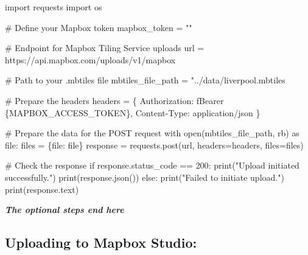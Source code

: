 \documentclass[
  letterpaper,
  DIV=11,
  numbers=noendperiod]{scrreprt}
\newenvironment{Shaded}{\begin{snugshade}}{\end{snugshade}}
\newcommand{\BuiltInTok}[1]{\textcolor[rgb]{0.00,0.23,0.31}{#1}}
\newcommand{\CommentTok}[1]{\textcolor[rgb]{0.37,0.37,0.37}{#1}}
\newcommand{\ControlFlowTok}[1]{\textcolor[rgb]{0.00,0.23,0.31}{#1}}
\newcommand{\DecValTok}[1]{\textcolor[rgb]{0.68,0.00,0.00}{#1}}
\newcommand{\ErrorTok}[1]{\textcolor[rgb]{0.68,0.00,0.00}{#1}}
\newcommand{\ImportTok}[1]{\textcolor[rgb]{0.00,0.46,0.62}{#1}}
\newcommand{\NormalTok}[1]{\textcolor[rgb]{0.00,0.23,0.31}{#1}}
\newcommand{\OperatorTok}[1]{\textcolor[rgb]{0.37,0.37,0.37}{#1}}
\newcommand{\SpecialCharTok}[1]{\textcolor[rgb]{0.37,0.37,0.37}{#1}}
\newcommand{\SpecialStringTok}[1]{\textcolor[rgb]{0.13,0.47,0.30}{#1}}
\newcommand{\StringTok}[1]{\textcolor[rgb]{0.13,0.47,0.30}{#1}}
\begin{document}
\begin{Shaded}
\begin{Highlighting}[]
\ImportTok{import}\NormalTok{ requests}
\ImportTok{import}\NormalTok{ os}

\CommentTok{\# Define your Mapbox token}
\NormalTok{mapbox\_token }\OperatorTok{=} \StringTok{""}

\CommentTok{\# Endpoint for Mapbox Tiling Service uploads}
\NormalTok{url }\OperatorTok{=} \StringTok{\textquotesingle{}https://api.mapbox.com/uploads/v1/mapbox\textquotesingle{}}

\CommentTok{\# Path to your .mbtiles file}
\NormalTok{mbtiles\_file\_path }\OperatorTok{=} \StringTok{"../data/liverpool.mbtiles\textquotesingle{}}

\ErrorTok{\# Prepare the headers}
\NormalTok{headers }\OperatorTok{=}\NormalTok{ \{}
    \StringTok{\textquotesingle{}Authorization\textquotesingle{}}\NormalTok{: }\SpecialStringTok{f\textquotesingle{}Bearer }\SpecialCharTok{\{}\NormalTok{MAPBOX\_ACCESS\_TOKEN}\SpecialCharTok{\}}\SpecialStringTok{\textquotesingle{}}\NormalTok{,}
    \StringTok{\textquotesingle{}Content{-}Type\textquotesingle{}}\NormalTok{: }\StringTok{\textquotesingle{}application/json\textquotesingle{}}
\NormalTok{\}}

\CommentTok{\# Prepare the data for the POST request}
\ControlFlowTok{with} \BuiltInTok{open}\NormalTok{(mbtiles\_file\_path, }\StringTok{\textquotesingle{}rb\textquotesingle{}}\NormalTok{) }\ImportTok{as} \BuiltInTok{file}\NormalTok{:}
\NormalTok{    files }\OperatorTok{=}\NormalTok{ \{}\StringTok{\textquotesingle{}file\textquotesingle{}}\NormalTok{: }\BuiltInTok{file}\NormalTok{\}}
\NormalTok{    response }\OperatorTok{=}\NormalTok{ requests.post(url, headers}\OperatorTok{=}\NormalTok{headers, files}\OperatorTok{=}\NormalTok{files)}

\CommentTok{\# Check the response}
\ControlFlowTok{if}\NormalTok{ response.status\_code }\OperatorTok{==} \DecValTok{200}\NormalTok{:}
    \BuiltInTok{print}\NormalTok{(}\StringTok{"Upload initiated successfully."}\NormalTok{)}
    \BuiltInTok{print}\NormalTok{(response.json())}
\ControlFlowTok{else}\NormalTok{:}
    \BuiltInTok{print}\NormalTok{(}\StringTok{"Failed to initiate upload."}\NormalTok{)}
    \BuiltInTok{print}\NormalTok{(response.text)}
\end{Highlighting}
\end{Shaded}

\textbf{\emph{The optional steps end here}}

\hypertarget{uploading-to-mapbox-studio}{%
\subsection{\texorpdfstring{Uploading to \textbf{Mapbox
Studio}:}{Uploading to Mapbox Studio:}}\label{uploading-to-mapbox-studio}}
\end{document}

